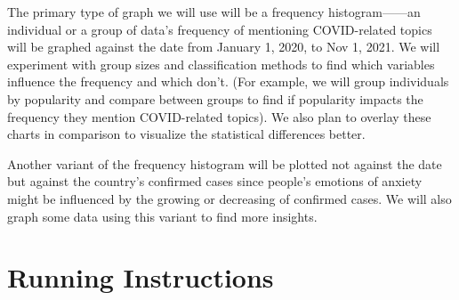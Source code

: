 \documentclass{article}
\begin{document}
    The primary type of graph we will use will be a frequency histogram——an individual or a group of data’s frequency of mentioning COVID-related topics will be graphed against the date from January 1, 2020, to Nov 1, 2021. We will experiment with group sizes and classification methods to find which variables influence the frequency and which don’t. (For example, we will group individuals by popularity and compare between groups to find if popularity impacts the frequency they mention COVID-related topics). We also plan to overlay these charts in comparison to visualize the statistical differences better.

    Another variant of the frequency histogram will be plotted not against the date but against the country’s confirmed cases since people’s emotions of anxiety might be influenced by the growing or decreasing of confirmed cases. We will also graph some data using this variant to find more insights.

    \section{Running Instructions}
    \indent
\end{document}
